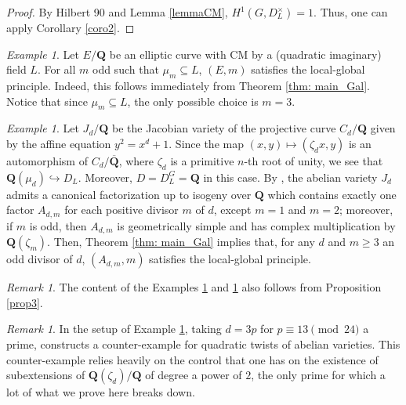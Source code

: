 \documentclass[a4paper,10pt]{amsart}
\theoremstyle{plain}
\theoremstyle{definition}
\theoremstyle{remark}
\newtheorem{remark}[theorem]{Remark}
\newtheorem{example}[theorem]{Example}
\def\Q{\mathbf Q}
\newcommand{\bD}{D_L}
\begin{document}
\begin{proof}
By Hilbert 90 and Lemma \ref{lemmaCM}, \(H^1(G,\bD^\times)=1\). Thus, one can apply Corollary \ref{coro2}.
\end{proof}

\begin{example}\label{example: ec}
Let \(E/\Q\) be an elliptic curve with CM by a (quadratic imaginary) field \(L\). For all \(m\) odd such that \(\mu_m \subseteq L\), \((E, m)\) satisfies the local-global principle. Indeed, this follows immediately from Theorem \ref{thm: main_Gal}. Notice that since \(\mu_m \subseteq L\), the only possible choice is \(m = 3\).
\end{example}

\begin{example}
\label{example: GGL}
Let \(J_d/\Q\) be the Jacobian variety of the projective curve \(C_d/\Q\) given by the affine equation \(y^2=x^d+1\). 
Since the map \((x,y)\mapsto (\zeta_dx,y)\) is an automorphism of \(C_d/\overline{\Q}\), where \(\zeta_d\) is a primitive \(n\)-th root of unity, we see that \(\Q(\mu_d)\hookrightarrow \bD\). Moreover, \(D = \bD^G = \Q\) in this case.
By \cite[Theorem 3.0.1]{GGL}, the abelian variety \(J_d\) admits a canonical factorization up to isogeny over \(\Q\) 
which contains exactly one factor \(A_{d,m}\) for each positive divisor \(m\) of \(d\), except \(m=1\) and \(m=2\); moreover, if \(m\) is odd, then \(A_{d, m}\) is geometrically simple and has complex multiplication by \(\Q(\zeta_m)\). 
Then, Theorem \ref{thm: main_Gal} implies that, for any \(d\) and \(m\geq 3\) an odd divisor of \(d\), \((A_{d, m}, m)\) satisfies the local-global principle.
\end{example}

\begin{remark}
The content of the Examples \ref{example: ec} and \ref{example: GGL} also follows from Proposition \ref{prop3}.
\end{remark}

\begin{remark}
In the setup of Example \ref{example: GGL}, taking \(d = 3p\) for \(p \equiv 13 \pmod{24}\) a prime, \cite{ACF} constructs a counter-example for quadratic twists of abelian varieties. This counter-example relies heavily on the control that one has on the existence of subextensions of \(\Q(\zeta_d)/\Q\) of degree a power of \(2\), the only prime for which a lot of what we prove here breaks down. 
\end{remark}
\end{document}
